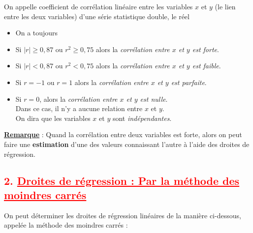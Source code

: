 \documentclass[12pt,a4paper]{article}
\begin{document}
On appelle coefficient de corrélation linéaire entre les variables \( x \) et \( y \) (le lien entre les deux variables) d’une série statistique double, le réel


\quad {} \quad
{}


\begin{itemize}
    \item On a toujours 
    \item Si \( |r| \geq 0{,}87 \) ou \( r^2 \geq 0{,}75 \) alors la \textit{corrélation entre \( x \) et \( y \) est forte}.
    \item Si \( |r| < 0{,}87 \) ou \( r^2 < 0{,}75 \) alors la \textit{corrélation entre \( x \) et \( y \) est faible}.
    \item Si \( r = -1 \) ou \( r = 1 \) alors la \textit{corrélation entre \( x \) et \( y \) est parfaite}.
    \item Si \( r = 0 \), alors la \textit{corrélation entre \( x \) et \( y \) est nulle}.\\
    Dans ce cas, il n’y a aucune relation entre \( x \) et \( y \).\\
    On dira que les variables \( x \) et \( y \) sont \textit{indépendantes}.
\end{itemize}

\vspace{0.2cm}
\noindent
\textbf{\underline{Remarque}} : Quand la corrélation entre deux variables est forte, alors on peut faire une \textbf{estimation} d’une des valeurs connaissant l’autre à l’aide des droites de régression.

\subsection*{\textcolor{red}{2. \underline{Droites de régression : Par la méthode des moindres carrés}}}

On peut déterminer les droites de régression linéaires de la manière ci-dessous, appelée la méthode des moindres carrés :


\quad {}



\quad {}
\end{document}
